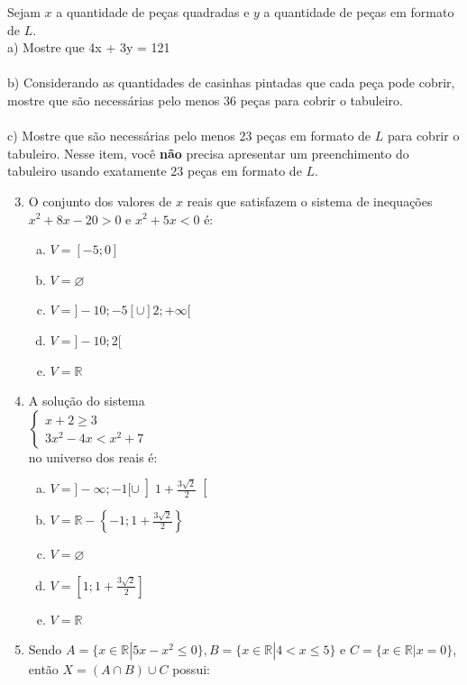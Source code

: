 \documentclass[a4paper,14pt]{article}
\begin{document}
	Sejam $x$ a quantidade de peças quadradas e $y$ a quantidade de peças em formato de $L$. \\
	a) Mostre que 4x + 3y = 121 \\\\
	b) Considerando as quantidades de casinhas pintadas que cada peça pode cobrir, mostre que são necessárias pelo menos 36 peças para cobrir o tabuleiro. \\\\
	c) Mostre que são necessárias pelo menos 23 peças em formato de $L$ para cobrir o tabuleiro. Nesse item, você \textbf{não} precisa apresentar um preenchimento do tabuleiro usando exatamente 23 peças em formato de $L$.	
	\newpage
	\begin{multicols}{2}
		\begin{enumerate}
			\setcounter{enumi}{2}
			\item O conjunto dos valores de $x$ reais que satisfazem o sistema de inequações $x^2 + 8x - 20 > 0$ e $x^2 + 5x < 0$ é:
			\begin{enumerate}[a)]
				\item $V = [-5; 0]$
				\item $V = \varnothing$
				\item $V = ]-10; -5[ \cup ]2; +\infty[$
				\item $V = ]-10; 2[$
				\item $V = \mathbb{R}$
			\end{enumerate}
			\item A solução do sistema \\ $\begin{cases} x + 2 \geq 3 \\ 3x^2 - 4x < x^2 + 7 \end{cases}$ \\ no universo dos reais é:
			\begin{enumerate}[a)]
				\item $V = ]-\infty; -1[ \cup \left]1 + \frac{3 \sqrt{2}}{2}\right[$
				\item $V = \mathbb{R} - \left\{ -1; 1 + \frac{3\sqrt{2}}{2}\right\}$
				\item $V = \varnothing$
				\item $V = \left[1; 1 + \frac{3\sqrt{2}}{2}\right]$
				\item $V = \mathbb{R}$
			\end{enumerate}
			\item Sendo $A = \{x \in \mathbb{R} | 5x - x^2 \leq 0\}, B = \{x \in \mathbb{R} | 4 < x \leq 5 \}$ e $C = \{x \in \mathbb{R} | x = 0\}$, então $X = (A \cap B) \cup C$ possui:

\end{enumerate}
\end{multicols}
\end{document}
